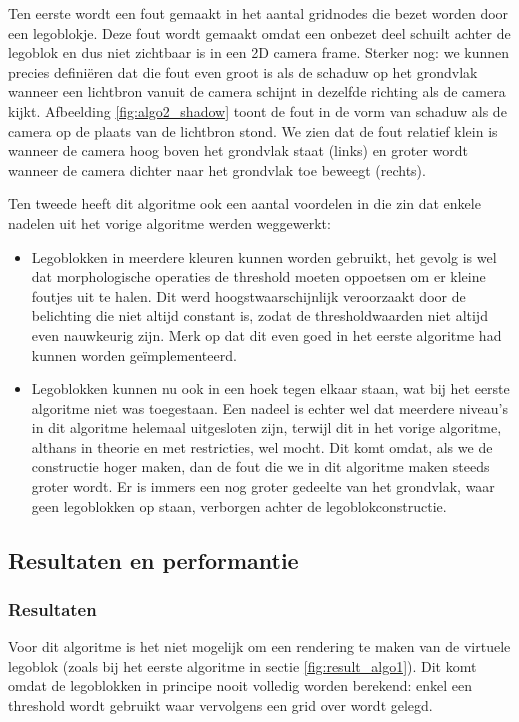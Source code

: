 Ten eerste wordt een fout gemaakt in het aantal gridnodes die bezet worden door een legoblokje. Deze fout wordt gemaakt omdat een onbezet deel schuilt achter de legoblok en dus niet zichtbaar is in een 2D camera frame. Sterker nog: we kunnen precies defini\"eren dat die fout even groot is als de schaduw op het grondvlak wanneer een lichtbron vanuit de camera schijnt in dezelfde richting als de camera kijkt. Afbeelding \ref{fig:algo2_shadow} toont de fout in de vorm van schaduw als de camera op de plaats van de lichtbron stond. We zien dat de fout relatief klein is wanneer de camera hoog boven het grondvlak staat (links) en groter wordt wanneer de camera dichter naar het grondvlak toe beweegt (rechts).

Ten tweede heeft dit algoritme ook een aantal voordelen in die zin dat enkele nadelen uit het vorige algoritme werden weggewerkt:
\begin{itemize}
\item Legoblokken in meerdere kleuren kunnen worden gebruikt, het gevolg is wel dat morphologische operaties de threshold moeten oppoetsen om er kleine foutjes uit te halen. Dit werd hoogstwaarschijnlijk veroorzaakt door de belichting die niet altijd constant is, zodat de thresholdwaarden niet altijd even nauwkeurig zijn. Merk op dat dit even goed in het eerste algoritme had kunnen worden ge\"implementeerd.
\item Legoblokken kunnen nu ook in een hoek tegen elkaar staan, wat bij het eerste algoritme niet was toegestaan. Een nadeel is echter wel dat meerdere niveau's in dit algoritme helemaal uitgesloten zijn, terwijl dit in het vorige algoritme, althans in theorie en met restricties, wel mocht. Dit komt omdat, als we de constructie hoger maken, dan de fout die we in dit algoritme maken steeds groter wordt. Er is immers een nog groter gedeelte van het grondvlak, waar geen legoblokken op staan, verborgen achter de legoblokconstructie.
\end{itemize}

\subsection{Resultaten en performantie}

\subsubsection*{Resultaten}
Voor dit algoritme is het niet mogelijk om een rendering te maken van de virtuele legoblok (zoals bij het eerste algoritme in sectie \ref{fig:result_algo1}). Dit komt omdat de legoblokken in principe nooit volledig worden berekend: enkel een threshold wordt gebruikt waar vervolgens een grid over wordt gelegd.

